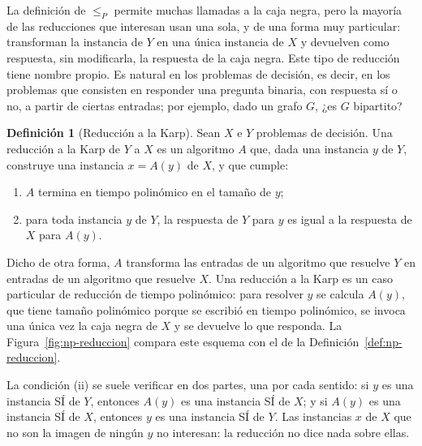 \documentclass[12pt, spanish, oneside, openany]{book}
\newcommand{\redp}{\le_{P}}
\theoremstyle{uprightplain}
\theoremstyle{definition}
\newtheorem{definicion}[teorema]{Definición}
\theoremstyle{remark}
\theoremstyle{definition}
\begin{document}
La definición de $\redp$ permite muchas llamadas a la caja negra, pero la mayoría de las reducciones que interesan usan una sola, y de una forma muy particular: transforman la instancia de $Y$ en una única instancia de $X$ y devuelven como respuesta, sin modificarla, la respuesta de la caja negra. Este tipo de reducción tiene nombre propio. Es natural en los problemas de decisión, es decir, en los problemas que consisten en responder una pregunta binaria, con respuesta sí o no, a partir de ciertas entradas; por ejemplo, dado un grafo $G$, ¿es $G$ bipartito?

\begin{definicion}[Reducción a la Karp]
\label{def:np-karp}
Sean $X$ e $Y$ problemas de decisión. Una reducción a la Karp de $Y$ a $X$ es un algoritmo $A$ que, dada una instancia $y$ de $Y$, construye una instancia $x=A(y)$ de $X$, y que cumple:
\begin{enumerate}[label=(\roman*)]
    \item $A$ termina en tiempo polinómico en el tamaño de $y$;
    \item para toda instancia $y$ de $Y$, la respuesta de $Y$ para $y$ es igual a la respuesta de $X$ para $A(y)$.
\end{enumerate}
\end{definicion}

Dicho de otra forma, $A$ transforma las entradas de un algoritmo que resuelve $Y$ en entradas de un algoritmo que resuelve $X$. Una reducción a la Karp es un caso particular de reducción de tiempo polinómico: para resolver $y$ se calcula $A(y)$, que tiene tamaño polinómico porque se escribió en tiempo polinómico, se invoca una única vez la caja negra de $X$ y se devuelve lo que responda. La Figura~\ref{fig:np-reduccion} compara este esquema con el de la Definición~\ref{def:np-reduccion}.

La condición (ii) se suele verificar en dos partes, una por cada sentido: si $y$ es una instancia SÍ de $Y$, entonces $A(y)$ es una instancia SÍ de $X$; y si $A(y)$ es una instancia SÍ de $X$, entonces $y$ es una instancia SÍ de $Y$. Las instancias $x$ de $X$ que no son la imagen de ningún $y$ no interesan: la reducción no dice nada sobre ellas.
\end{document}
